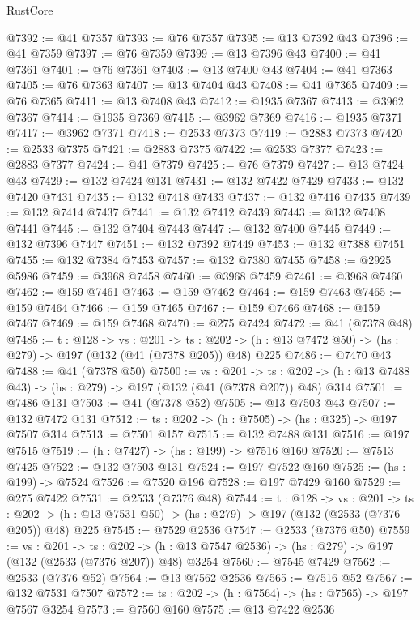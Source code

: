 \begin{lexlean}{RustCore}
\begin{coremodule}
@7392 := @41 @7357
@7393 := @76 @7357
@7395 := @13 @7392 @43
@7396 := @41 @7359
@7397 := @76 @7359
@7399 := @13 @7396 @43
@7400 := @41 @7361
@7401 := @76 @7361
@7403 := @13 @7400 @43
@7404 := @41 @7363
@7405 := @76 @7363
@7407 := @13 @7404 @43
@7408 := @41 @7365
@7409 := @76 @7365
@7411 := @13 @7408 @43
@7412 := @1935 @7367
@7413 := @3962 @7367
@7414 := @1935 @7369
@7415 := @3962 @7369
@7416 := @1935 @7371
@7417 := @3962 @7371
@7418 := @2533 @7373
@7419 := @2883 @7373
@7420 := @2533 @7375
@7421 := @2883 @7375
@7422 := @2533 @7377
@7423 := @2883 @7377
@7424 := @41 @7379
@7425 := @76 @7379
@7427 := @13 @7424 @43
@7429 := @132 @7424 @131
@7431 := @132 @7422 @7429
@7433 := @132 @7420 @7431
@7435 := @132 @7418 @7433
@7437 := @132 @7416 @7435
@7439 := @132 @7414 @7437
@7441 := @132 @7412 @7439
@7443 := @132 @7408 @7441
@7445 := @132 @7404 @7443
@7447 := @132 @7400 @7445
@7449 := @132 @7396 @7447
@7451 := @132 @7392 @7449
@7453 := @132 @7388 @7451
@7455 := @132 @7384 @7453
@7457 := @132 @7380 @7455
@7458 := @2925 @5986
@7459 := @3968 @7458
@7460 := @3968 @7459
@7461 := @3968 @7460
@7462 := @159 @7461
@7463 := @159 @7462
@7464 := @159 @7463
@7465 := @159 @7464
@7466 := @159 @7465
@7467 := @159 @7466
@7468 := @159 @7467
@7469 := @159 @7468
@7470 := @275 @7424
@7472 := @41 (@7378 @48)
@7485 := {t : @128} ->
  {vs : @201} ->
  {ts : @202} -> (h : @13 @7472 @50) -> (hs : @279) -> @197 (@132 (@41 (@7378 @205)) @48) @225
@7486 := @7470 @43
@7488 := @41 (@7378 @50)
@7500 := {vs : @201} ->
  {ts : @202} -> (h : @13 @7488 @43) -> (hs : @279) -> @197 (@132 (@41 (@7378 @207)) @48) @314
@7501 := @7486 @131
@7503 := @41 (@7378 @52)
@7505 := @13 @7503 @43
@7507 := @132 @7472 @131
@7512 := {ts : @202} -> (h : @7505) -> (hs : @325) -> @197 @7507 @314
@7513 := @7501 @157
@7515 := @132 @7488 @131
@7516 := @197 @7515
@7519 := (h : @7427) -> (hs : @199) -> @7516 @160
@7520 := @7513 @7425
@7522 := @132 @7503 @131
@7524 := @197 @7522 @160
@7525 := (hs : @199) -> @7524
@7526 := @7520 @196
@7528 := @197 @7429 @160
@7529 := @275 @7422
@7531 := @2533 (@7376 @48)
@7544 := {t : @128} ->
  {vs : @201} ->
  {ts : @202} -> (h : @13 @7531 @50) -> (hs : @279) -> @197 (@132 (@2533 (@7376 @205)) @48) @225
@7545 := @7529 @2536
@7547 := @2533 (@7376 @50)
@7559 := {vs : @201} ->
  {ts : @202} -> (h : @13 @7547 @2536) -> (hs : @279) -> @197 (@132 (@2533 (@7376 @207)) @48) @3254
@7560 := @7545 @7429
@7562 := @2533 (@7376 @52)
@7564 := @13 @7562 @2536
@7565 := @7516 @52
@7567 := @132 @7531 @7507
@7572 := {ts : @202} -> (h : @7564) -> (hs : @7565) -> @197 @7567 @3254
@7573 := @7560 @160
@7575 := @13 @7422 @2536

\end{coremodule}
\end{lexlean}
